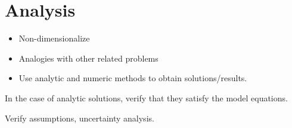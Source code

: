 \section{Analysis}
\begin{itemize}
\item Non-dimensionalize
\item Analogies with other related problems
\item Use analytic and numeric methods to obtain solutions/results.
\end{itemize}

In the case of analytic solutions, verify that they satisfy the model equations.

Verify assumptions, uncertainty analysis.
